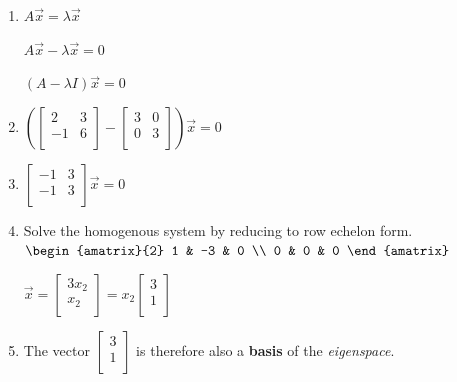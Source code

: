 \documentclass[12pt, letterpaper]{article}
\begin{document}
  \begin{enumerate}
    \item $ A \vec{x} = \lambda \vec{x} $
      \medskip

      $ A \vec{x} - \lambda \vec{x} = 0 $
      \medskip

      $ ( A - \lambda I ) \vec{x} = 0 $
      \medskip
    \item $ (
        \begin{bmatrix}
          2 & 3 \\
          -1 & 6 \\
        \end{bmatrix} -
        \begin{bmatrix}
          3 & 0 \\
          0 & 3 \\
      \end{bmatrix}) \vec{x} = 0 $
    \item $
      \begin{bmatrix}
        -1 & 3 \\
        -1 & 3 \\
      \end{bmatrix} \vec{x} = 0 $
    \item Solve the homogenous system by reducing to row echelon form.
      $
      \begin{amatrix}{2}
        1 & -3 & 0 \\
        0 & 0 & 0
      \end{amatrix} $
      \medskip

      $ \vec{x} =
      \begin{bmatrix}
        3 x_2 \\
        x_2 \\
      \end{bmatrix} = x_2
      \begin{bmatrix}
        3 \\
        1 \\
      \end{bmatrix} $
      \medskip
    \item The vector $
      \begin{bmatrix}
        3 \\
        1 \\
      \end{bmatrix} $ is therefore also a \textbf{basis} of the
      \textit{eigenspace}.

  \end{enumerate}
\end{document}
